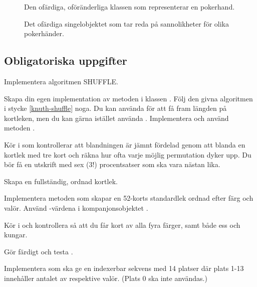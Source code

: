 \begin{figure}
\caption{Den ofärdiga, oföränderliga klassen  som representerar en pokerhand.}
\label{shuffle:fig-hand}
\end{figure}

\begin{figure}
\caption{Det ofärdiga singelobjektet  som tar reda på sannolikheter för olika pokerhänder.}
\label{shuffle:fig-pokerprob}
\end{figure}


\subsection{Obligatoriska uppgifter}\label{subsection:lab:shuffle:tasks}


\Task Implementera algoritmen SHUFFLE.

\Subtask Skapa din egen implementation av metoden  i klassen . Följ den givna algoritmen i stycke \ref{knuth-shuffle} noga. Du kan använda  för att få fram längden på kortleken, men du kan gärna istället använda . Implementera och använd metoden  .

\Subtask Kör  i  som kontrollerar att blandningen är jämnt fördelad genom att blanda en kortlek med tre kort och räkna hur ofta varje möjlig permutation dyker upp. Du bör få en utskrift med sex ($3!$) procentsatser som ska vara nästan lika.


\Task Skapa en fullständig, ordnad kortlek.

\Subtask Implementera metoden  som skapar en 52-korts standardlek ordnad efter färg och valör. Använd -värdena i kompanjonsobjektet .

\Subtask Kör  i  och kontrollera så att du får kort av alla fyra färger, samt både ess och kungar.


\Task Gör färdigt och testa .

\Subtask Implementera  som ska ge en indexerbar sekvens med 14 platser där plats 1-13 innehåller antalet av respektive valör. (Plats 0 ska inte användas.)

